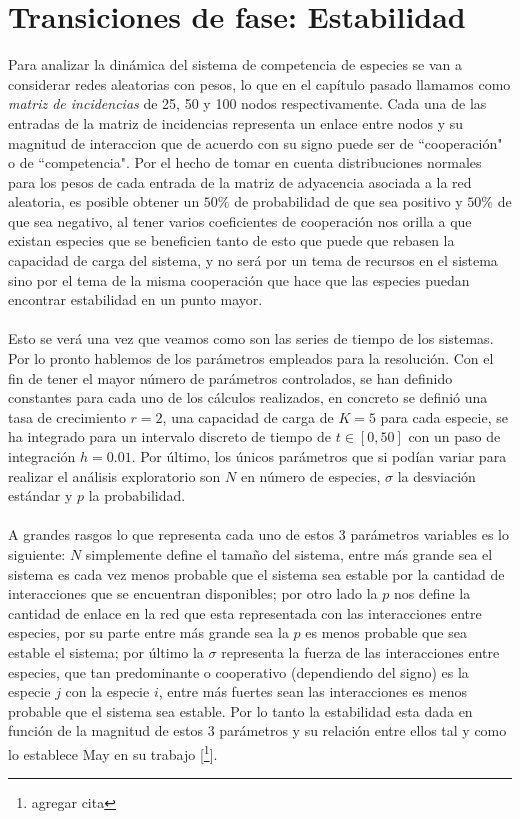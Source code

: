 \chapter{Transiciones de fase: Estabilidad}

Para analizar la dinámica del sistema de competencia de especies se van a considerar redes aleatorias con pesos, lo que en el capítulo pasado llamamos como \textit{matriz de incidencias} de 25, 50 y 100 nodos respectivamente. Cada una de las entradas de la matriz de incidencias representa un enlace entre nodos y su magnitud de interaccion que de acuerdo con su signo puede ser de ``cooperación" o de ``competencia". Por el hecho de tomar en cuenta distribuciones normales para los pesos de cada entrada de la matriz de adyacencia asociada a la red aleatoria, es posible obtener un $50\%$ de probabilidad de que sea positivo y $50\%$ de que sea negativo, al tener varios coeficientes de cooperación nos orilla a que existan especies que se beneficien tanto de esto que puede que rebasen la capacidad de carga del sistema, y no será por un tema de recursos en el sistema sino por el tema de la misma cooperación que hace que las especies puedan encontrar estabilidad en un punto mayor.
\\
\\
Esto se verá una vez que veamos como son las series de tiempo de los sistemas. Por lo pronto hablemos de los parámetros empleados para la resolución. Con el fin de tener el mayor número de parámetros controlados, se han definido constantes para cada uno de los cálculos realizados, en concreto se definió una tasa de crecimiento $r=2$, una capacidad de carga de $K=5$ para cada especie, se ha integrado para un intervalo discreto de tiempo de $t\in[0,50]$ con un paso de integración $h=0.01$. Por último, los únicos parámetros que si podían variar para realizar el análisis exploratorio son $N$ en número de especies, $\sigma$ la desviación estándar y $p$ la probabilidad.\\
\\
A grandes rasgos lo que representa cada uno de estos 3 parámetros variables es lo siguiente: $N$ simplemente define el tamaño del sistema, entre más grande sea el sistema es cada vez menos probable que el sistema sea estable por la cantidad de interacciones que se encuentran disponibles; por otro lado la $p$ nos define la cantidad de enlace en la red que esta representada con las interacciones entre especies, por su parte entre más grande sea la $p$ es menos probable que sea estable el sistema; por último la $\sigma$ representa la fuerza de las interacciones entre especies, que tan predominante o cooperativo (dependiendo del signo) es la especie $j$ con la especie $i$, entre más fuertes sean las interacciones es menos probable que el sistema sea estable. Por lo tanto la estabilidad esta dada en función de la magnitud de estos 3 parámetros y su relación entre ellos tal y como lo establece May en su trabajo [\footnote{agregar cita}].\\
